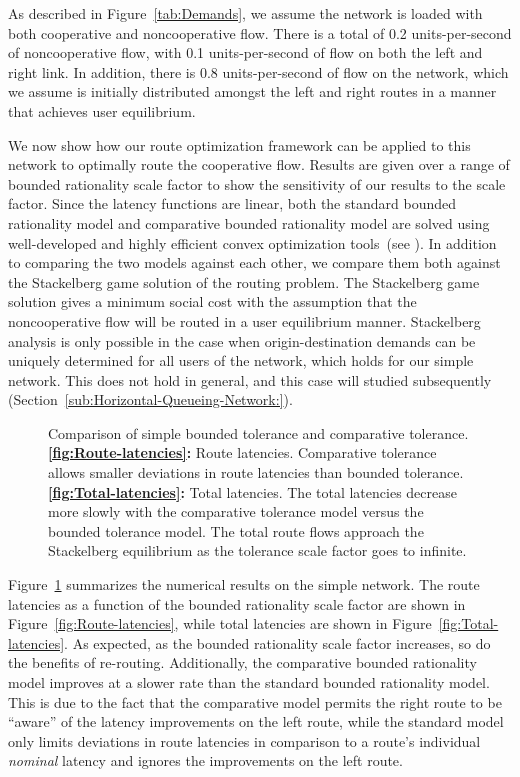 As described in Figure~\ref{tab:Demands}, we assume the network
is loaded with both cooperative and noncooperative flow. There is
a total of 0.2 units-per-second of noncooperative flow, with 0.1 units-per-second
of flow on both the left and right link. In addition, there is 0.8
units-per-second of flow on the network, which we assume is initially
distributed amongst the left and right routes in a manner that achieves
user equilibrium.

We now show how our route optimization framework can be applied to
this network to optimally route the cooperative flow. Results are
given over a range of bounded rationality scale factor to show the
sensitivity of our results to the scale factor. Since the latency
functions are linear, both the standard bounded rationality model
and comparative bounded rationality model are solved using well-developed
and highly efficient convex optimization tools~(see \cite{cvxpy}).
In addition to comparing the two models against each other, we compare
them both against the Stackelberg game solution of the routing problem.
The Stackelberg game solution gives a minimum social cost with the
assumption that the noncooperative flow will be routed in a user equilibrium
manner. Stackelberg analysis is only possible in the case when origin-destination
demands can be uniquely determined for all users of the network, which
holds for our simple network. This does not hold in general, and this
case will studied subsequently (Section~\ref{sub:Horizontal-Queueing-Network:}).
\begin{figure}
\centering%
\hfill%
%
\caption{Comparison of simple bounded tolerance
and comparative tolerance. \textbf{\ref{fig:Route-latencies}:} Route
latencies. Comparative tolerance allows smaller deviations in route
latencies than bounded tolerance. \textbf{\ref{fig:Total-latencies}:}
Total latencies. The total latencies decrease more slowly with the
comparative tolerance model versus the bounded tolerance model. The
total route flows approach the Stackelberg equilibrium as the tolerance
scale factor goes to infinite.}%
\label{fig:Comparison-of-simple}
\end{figure}


Figure~\ref{fig:Comparison-of-simple} summarizes the numerical results
on the simple network. The route latencies as a function of the bounded
rationality scale factor are shown in Figure~\ref{fig:Route-latencies},
while total latencies are shown in Figure~\ref{fig:Total-latencies}.
As expected, as the bounded rationality scale factor increases, so
do the benefits of re-routing. Additionally, the comparative bounded
rationality model improves at a slower rate than the standard bounded
rationality model. This is due to the fact that the comparative model
permits the right route to be ``aware'' of the latency improvements
on the left route, while the standard model only limits deviations
in route latencies in comparison to a route's individual \emph{nominal}
latency and ignores the improvements on the left route.

